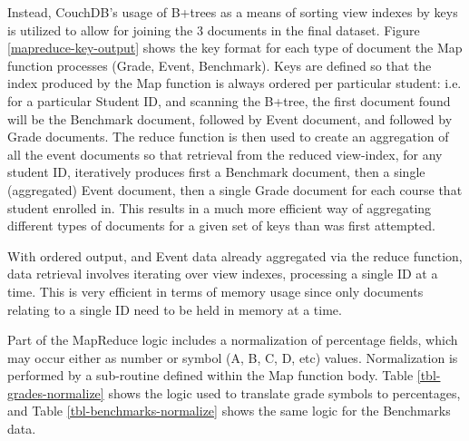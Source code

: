 Instead, CouchDB's usage of B+trees as a means of sorting view indexes by keys is utilized to allow for joining the 3 documents in the final dataset. Figure \ref{mapreduce-key-output} shows the key format for each type of document the Map function processes (Grade, Event, Benchmark). Keys are defined so that the index produced by the Map function is always ordered per particular student: i.e. for a particular Student ID, and scanning the B+tree, the first document found will be the Benchmark document, followed by Event document, and followed by Grade documents. The reduce function is then used to create an aggregation of all the event documents so that retrieval from the reduced view-index, for any student ID, iteratively produces first a Benchmark document, then a single (aggregated) Event document, then a single Grade document for each course that student enrolled in. This results in a much more efficient way of aggregating different types of documents for a given set of keys than was first attempted.

With ordered output, and Event data already aggregated via the reduce function, data retrieval involves iterating over view indexes, processing a single ID at a time. This is very efficient in terms of memory usage since only documents relating to a single ID need to be held in memory at a time.

Part of the MapReduce logic includes a normalization of percentage fields, which may occur either as number or symbol (A, B, C, D, etc) values. Normalization is performed by a sub-routine defined within the Map function body. Table \ref{tbl-grades-normalize} shows the logic used to translate grade symbols to percentages, and Table \ref{tbl-benchmarks-normalize} shows the same logic for the Benchmarks data.

